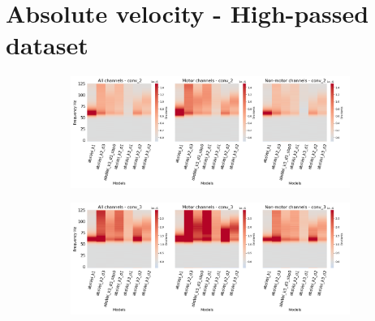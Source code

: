 \clearpage
\section*{Absolute velocity - High-passed dataset}\label{subsec:absVel-high-passed-dataset-appendixB}
\begin{figure}[!htpb]
\centering
\begin{subfigure}[b]{\textwidth}
   \includegraphics[width=1\linewidth]{img/appendix/A/conv-2/hp-sm/absVel-model-gradients_all_kinds}
   \caption{}
   \label{fig:absVel-hp-shifted-grads-conv-2}
\end{subfigure}

\begin{subfigure}[b]{\textwidth}
   \includegraphics[width=1\linewidth]{img/appendix/A/conv-3/hp-sm/absVel-model-gradients_all_kinds}
   \caption{}
   \label{fig:absVel-hp-shifted-grads-conv-3}
\end{subfigure}
\end{figure}
\clearpage   

